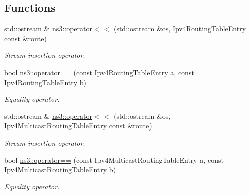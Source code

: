 \subsection*{Functions}
\begin{DoxyCompactItemize}
\item 
std\+::ostream \& \hyperlink{namespacens3_aff55c50294fb95c3dd0a88d4f8cf01e8}{ns3\+::operator$<$$<$} (std\+::ostream \&os, Ipv4\+Routing\+Table\+Entry const \&route)
\begin{DoxyCompactList}\small\item\em Stream insertion operator. \end{DoxyCompactList}\item 
bool \hyperlink{namespacens3_a81fd6e2e3cb41f2bfee94a3540744f84}{ns3\+::operator==} (const Ipv4\+Routing\+Table\+Entry a, const Ipv4\+Routing\+Table\+Entry \hyperlink{lte__pathloss_8m_a21ad0bd836b90d08f4cf640b4c298e7c}{b})
\begin{DoxyCompactList}\small\item\em Equality operator. \end{DoxyCompactList}\item 
std\+::ostream \& \hyperlink{namespacens3_a0af860b24c8e4bb573f3752278086a47}{ns3\+::operator$<$$<$} (std\+::ostream \&os, Ipv4\+Multicast\+Routing\+Table\+Entry const \&route)
\begin{DoxyCompactList}\small\item\em Stream insertion operator. \end{DoxyCompactList}\item 
bool \hyperlink{namespacens3_a072094843022a03dcbeb1ca4dc95ec3d}{ns3\+::operator==} (const Ipv4\+Multicast\+Routing\+Table\+Entry a, const Ipv4\+Multicast\+Routing\+Table\+Entry \hyperlink{lte__pathloss_8m_a21ad0bd836b90d08f4cf640b4c298e7c}{b})
\begin{DoxyCompactList}\small\item\em Equality operator. \end{DoxyCompactList}\end{DoxyCompactItemize}
